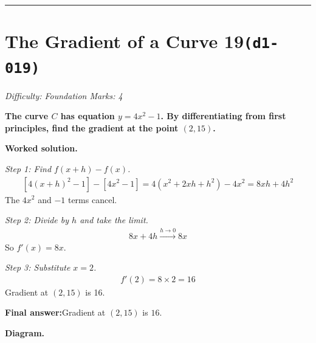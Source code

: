 \documentclass[11pt]{article}
\newcommand{\question}[1]{\par\medskip\noindent\textbf{#1}\par}
\begin{document}
\medskip\hrule

\section*{The Gradient of a Curve 19\quad\small\texttt{(d1-019)}}
\textit{Difficulty: Foundation \quad\textbar\quad Marks: 4}

\question{The curve \( C \) has equation \( y = 4x^2 - 1 \). By differentiating from first principles, find the gradient at the point \( (2, 15) \).}

\textbf{Worked solution.}

\textit{Step 1: Find \( f(x+h) - f(x) \).}
\[\begin{gathered}
[4(x+h)^2 - 1] - [4x^2 - 1] = 4(x^2 + 2xh + h^2) - 4x^2 = 8xh + 4h^2
\end{gathered}\]
The \( 4x^2 \) and \( -1 \) terms cancel.

\textit{Step 2: Divide by \( h \) and take the limit.}
\[\begin{gathered}
8x + 4h \xrightarrow{h \to 0} 8x
\end{gathered}\]
So \( f'(x) = 8x \).

\textit{Step 3: Substitute \( x = 2 \).}
\[\begin{gathered}
f'(2) = 8 \times 2 = 16
\end{gathered}\]
Gradient at \( (2, 15) \) is 16.

\begin{answerbox}
\textbf{Final answer:}\quad Gradient at \(\displaystyle  (2, 15) \) is \(\displaystyle  16 \).
\end{answerbox}
\textbf{Diagram.}
\end{document}
